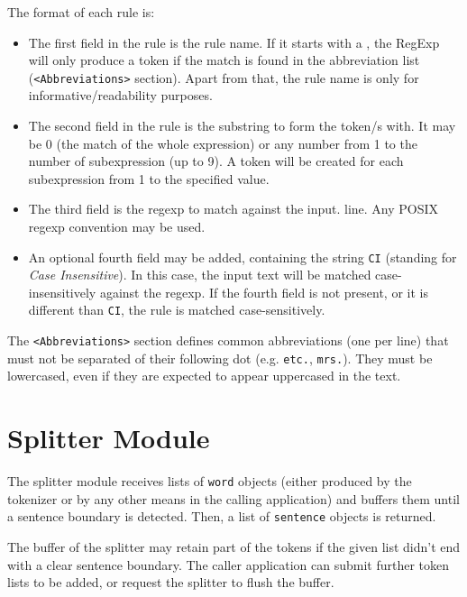 \documentclass[a4paper]{book}
\begin{document}
   The format of each rule is:
  \begin{itemize}
    \item The first field in the rule is the rule name. If it starts
      with a {\tt *}, the RegExp will only produce a token if the
      match is found in the abbreviation list (\verb#<Abbreviations>#
      section).  Apart from that, the rule name is only for
      informative/readability purposes.

    \item The second field in the rule is the substring to form the
      token/s with.  It may be 0 (the match of the whole expression)
      or any number from 1 to the number of subexpression (up to 9). A
      token will be created for each subexpression from 1 to the
      specified value.

    \item The third field is the regexp to match against the input.
      line. Any POSIX regexp convention may be used.

    \item An optional fourth field may be added, containing the string
      {\tt CI} (standing for {\sl Case Insensitive}). In this case,
      the input text will be matched case-insensitively against the
      regexp.  If the fourth field is not present, or it is different
      than {\tt CI}, the rule is matched case-sensitively.
  \end{itemize}

  The \verb#<Abbreviations># section defines common abbreviations (one
  per line) that must not be separated of their following dot
  (e.g. {\tt etc.}, {\tt mrs.}). They must be lowercased, even if
  they are expected to appear uppercased in the text.

\section{Splitter Module}
\label{file-split}

  The splitter module receives lists of {\tt word} objects (either
  produced by the tokenizer or by any other means in the calling
  application) and buffers them until a sentence boundary is detected.
  Then, a list of {\tt sentence} objects is returned.

  The buffer of the splitter may retain part of the tokens if the
  given list didn't end with a clear sentence boundary.  The caller
  application can submit further token lists to be added, or request
  the splitter to flush the buffer.
\end{document}
